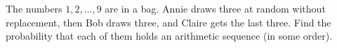 The numbers $1,2,\dots,9$ are in a bag. Annie draws three at random without replacement, then Bob draws three, and Claire gets the last three. Find the probability that each of them holds an arithmetic sequence (in some order).
